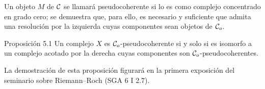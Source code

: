 Un objeto $M$ de $\mathcal C$ se llamará pseudocoherente si lo es como complejo concentrado en grado cero; se demuestra que, para ello, es necesario y suficiente que admita una resolución por la izquierda cuyas componentes sean objetos de $\mathcal C_o$.

\begin{statement}{Proposición 5.1}
Un complejo $X$ es $\mathcal C_o$-pseudocoherente si y solo si es isomorfo a un complejo acotado por la derecha cuyas componentes son $\mathcal C_o$-pseudocoherentes.
\end{statement}

La demostración de esta proposición figurará en la primera exposición del seminario sobre Riemann--Roch (SGA 6 I 2.7).
